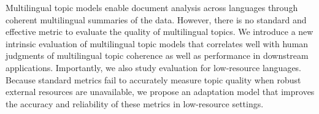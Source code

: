 Multilingual topic models enable document analysis across languages through coherent multilingual summaries of the data.  
However, there is no standard and effective metric to evaluate the quality of multilingual topics.
We introduce a new intrinsic evaluation of multilingual topic models that
 correlates well with human judgments of multilingual topic coherence as well as performance in downstream applications.
Importantly, we also study evaluation for low-resource languages.
Because standard metrics fail to accurately measure topic quality when robust external resources are unavailable,
we propose an adaptation model that improves the accuracy and reliability of these metrics in low-resource settings.